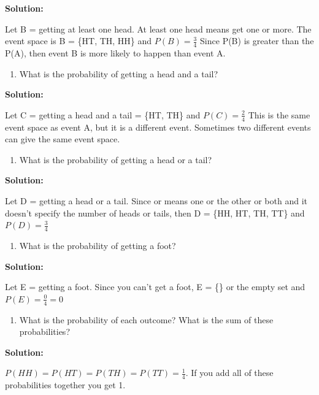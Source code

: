 \documentclass[]{book}
\providecommand{\tightlist}{%
  \setlength{\itemsep}{0pt}\setlength{\parskip}{0pt}}
\begin{document}
\textbf{Solution:}

Let B = getting at least one head. At least one head means get one
or more. The event space is B = \{HT, TH, HH\} and \(P(B)=\frac{3}{4}\)
Since P(B) is greater than the P(A), then event B is more likely to
happen than event A.

\begin{enumerate}
\def\labelenumi{\alph{enumi}.}
\setcounter{enumi}{3}
\tightlist
\item
  What is the probability of getting a head and a tail?
\end{enumerate}

\textbf{Solution:}

Let C = getting a head and a tail = \{HT, TH\} and \(P(C)=\frac{2}{4}\) This is the same event space as event A, but it is a different event. Sometimes two different events can give the same event space.

\begin{enumerate}
\def\labelenumi{\alph{enumi}.}
\setcounter{enumi}{4}
\tightlist
\item
  What is the probability of getting a head or a tail?
\end{enumerate}

\textbf{Solution:}

Let D = getting a head or a tail. Since or means one or the other or both and it doesn't specify the number of heads or tails, then D = \{HH, HT, TH, TT\} and \(P(D)=\frac{3}{4}\)

\begin{enumerate}
\def\labelenumi{\alph{enumi}.}
\setcounter{enumi}{5}
\tightlist
\item
  What is the probability of getting a foot?
\end{enumerate}

\textbf{Solution:}

Let E = getting a foot. Since you can't get a foot, E = \{\} or the empty set and \(P(E)=\frac{0}{4}=0\)

\begin{enumerate}
\def\labelenumi{\alph{enumi}.}
\setcounter{enumi}{6}
\tightlist
\item
  What is the probability of each outcome? What is the sum of these
  probabilities?
\end{enumerate}

\textbf{Solution:}

\(P(HH)=P(HT)=P(TH)=P(TT)=\frac{1}{4}\). If you add all of these probabilities together you get 1.
\end{document}
